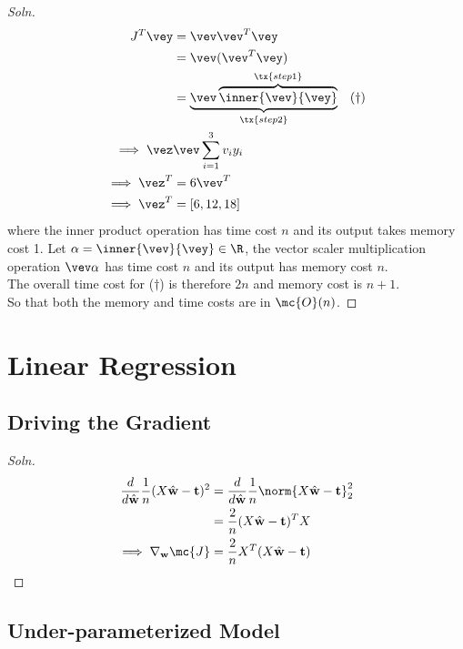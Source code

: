 \documentclass{article}
\begin{document}
	\subsubsection{}
	\begin{proof}[Soln]
		\begin{align}
			J^T \vey &= \vev \vev^T \vey \\
			&= \vev (\vev^T \vey) \\
			&= \underbrace{\vev \overbrace{\inner{\vev}{\vey}}^{\tx{step 1}}}_{\tx{step 2}}\quad (\dagger) \\
			\implies \vez & \vev \sum_{i=1}^3 v_i y_i \\
			\implies \vez^T &= 6 \vev^T \\
			\implies \vez^T &= [6, 12, 18]
		\end{align}
		where the inner product operation has time cost $n$ and its output takes memory cost 1. Let $\alpha = \inner{\vev}{\vey} \in \R$, the vector scaler multiplication operation $\vev \alpha$ has time cost $n$ and its output has memory cost $n$. \\
		The overall time cost for ($\dagger$) is therefore $2n$ and memory cost is $n + 1$. \\
		So that both the memory and time costs are in $\mc{O}(n)$.
	\end{proof}

	\section{Linear Regression}
	\subsection{Driving the Gradient}
	\begin{proof}[Soln]
		\begin{align}
			\frac{d}{d\hat{\textbf{w}}} \frac{1}{n} (X \hat{\textbf{w}} - \textbf{t})^2
			&= \frac{d}{d\hat{\textbf{w}}} \frac{1}{n} \norm{X \hat{\textbf{w}} - \textbf{t}}^2_2 \\
			&= \frac{2}{n} (X \hat{\textbf{w}} - \textbf{t})^T X \\
		\implies \nabla_{\textbf{w}} \mc{J} &= \frac{2}{n} X^T(X\hat{\textbf{w}} - \textbf{t})
		\end{align}
	\end{proof}

	\subsection{Under-parameterized Model}
\end{document}

